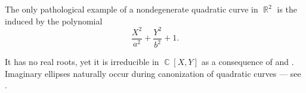 \begin{example}\label{ex:imaginary_ellipse}
  The only pathological example of a nondegenerate quadratic curve in \( \BbbR^2 \) is the  induced by the polynomial
  \begin{equation}\label{eq:ex:imaginary_ellipse}
    \frac {X^2} {a^2} + \frac {Y^2} {b^2} + 1.
  \end{equation}

  It has no real roots, yet it is irreducible in \( \BbbC[X, Y] \) as a consequence of  and . Imaginary ellipses naturally occur during canonization of quadratic curves --- see .
\end{example}

